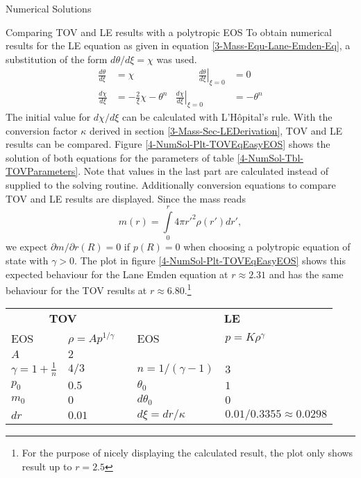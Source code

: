 \begin{section}{Numerical Solutions}
\begin{subsection}{Comparing TOV and LE results with a polytropic EOS}
To obtain numerical results for the \ac{LE} equation as given in equation \eqref{3-Mass-Equ-Lane-Emden-Eq}, a substitution of the form $d\theta/d\xi=\chi$ was used.
\begin{equation}
	\begin{aligned}
		\frac{d\theta}{d\xi} &= \chi &\hspace{1cm} \left.\frac{d\theta}{d\xi}\right|_{\xi=0} &= 0\\
		\frac{d\chi}{d\xi} &= -\frac{2}{\xi}\chi-\theta^n & \left.\frac{d\chi}{d\xi}\right|_{\xi=0} &= -\theta^n
		\label{4-NumSol-Equ-LE-Substitution}
	\end{aligned}
\end{equation}
The initial value for $d\chi/d\xi$ can be calculated with L'Hôpital's rule.
With the conversion factor $\kappa$ derived in section \ref{3-Mass-Sec-LEDerivation}, \ac{TOV} and \ac{LE} results can be compared.
Figure \ref{4-NumSol-Plt-TOVEqEasyEOS} shows the solution of both equations for the parameters of table \ref{4-NumSol-Tbl-TOVParameters}.
Note that values in the last part are calculated instead of supplied to the solving routine.
Additionally conversion equations to compare \ac{TOV} and \ac{LE} results are displayed.
Since the mass reads
\begin{equation}
	m(r) = \int\limits_0^r 4\pi r'^2\rho(r')dr',
\end{equation}
we expect $\partial m/\partial r(R)=0$ if $p(R)=0$ when choosing a polytropic equation of state with $\gamma>0$.
The plot in figure \ref{4-NumSol-Plt-TOVEqEasyEOS} shows this expected behaviour for the Lane Emden equation at $r\approx2.31$ and has the same behaviour for the \ac{TOV} results at $r\approx6.80$.\footnote{For the purpose of nicely displaying the calculated result, the plot only shows result up to $r=2.5$}
\begin{table}[H]
	\renewcommand{\arraystretch}{1.2}
	\centering
	\begin{tabular}{@{}llcll@{}}
		\toprule
		\multicolumn{2}{c}{\textbf{TOV}} & \phantom{abc} &\multicolumn{2}{c}{\textbf{LE}}\\
		\cmidrule{1-2} \cmidrule{4-5}
		EOS & $\rho=Ap^{1/\gamma}$ && EOS & $p=K\rho^{\gamma}$\\
		$A$ & $2$ & & \\
		$\gamma=1+\frac{1}{n}$ & $4/3$ && $n=1/(\gamma-1)$ & $3$\\
		$p_0$ & $0.5$ && $\theta_0$ & $1$\\
		$m_0$ & $0$ && $d\theta_0$ & $0$\\
		$dr$ & $0.01$ && $d\xi=dr/\kappa$ & $0.01/0.3355\approx0.0298$\\

\end{tabular}
\end{table}
\end{subsection}
\end{section}
